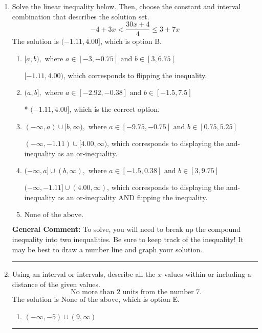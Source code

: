 \documentclass{extbook}[14pt]
\newcommand{\litem}[1]{\item #1

\rule{\textwidth}{0.4pt}}
\begin{document}
\begin{enumerate}
{\begin{enumerate}[label=\Alph*.]
Corresponds to inverting the inequality and negating the solution.
\item \( (-\infty, \infty) \)

Corresponds to the variable canceling, which does not happen in this instance.
\end{enumerate}

\textbf{General Comment:} When multiplying or dividing by a negative, flip the sign.
}
\litem{
Solve the linear inequality below. Then, choose the constant and interval combination that describes the solution set.
\[ -4 + 3 x < \frac{30 x + 4}{4} \leq 3 + 7 x \]The solution is \( (-1.11, 4.00] \), which is option B.\begin{enumerate}[label=\Alph*.]
\item \( [a, b), \text{ where } a \in [-3, -0.75] \text{ and } b \in [3, 6.75] \)

$[-1.11, 4.00)$, which corresponds to flipping the inequality.
\item \( (a, b], \text{ where } a \in [-2.92, -0.38] \text{ and } b \in [-1.5, 7.5] \)

* $(-1.11, 4.00]$, which is the correct option.
\item \( (-\infty, a) \cup [b, \infty), \text{ where } a \in [-9.75, -0.75] \text{ and } b \in [0.75, 5.25] \)

$(-\infty, -1.11) \cup [4.00, \infty)$, which corresponds to displaying the and-inequality as an or-inequality.
\item \( (-\infty, a] \cup (b, \infty), \text{ where } a \in [-1.5, 0.38] \text{ and } b \in [3, 9.75] \)

$(-\infty, -1.11] \cup (4.00, \infty)$, which corresponds to displaying the and-inequality as an or-inequality AND flipping the inequality.
\item \( \text{None of the above.} \)


\end{enumerate}

\textbf{General Comment:} To solve, you will need to break up the compound inequality into two inequalities. Be sure to keep track of the inequality! It may be best to draw a number line and graph your solution.
}
\litem{
Using an interval or intervals, describe all the $x$-values within or including a distance of the given values.
\[ \text{ No more than } 2 \text{ units from the number } 7. \]The solution is \( \text{None of the above} \), which is option E.\begin{enumerate}[label=\Alph*.]
\item \( (-\infty, -5) \cup (9, \infty) \)


\end{enumerate}}
\end{enumerate}
\end{document}
